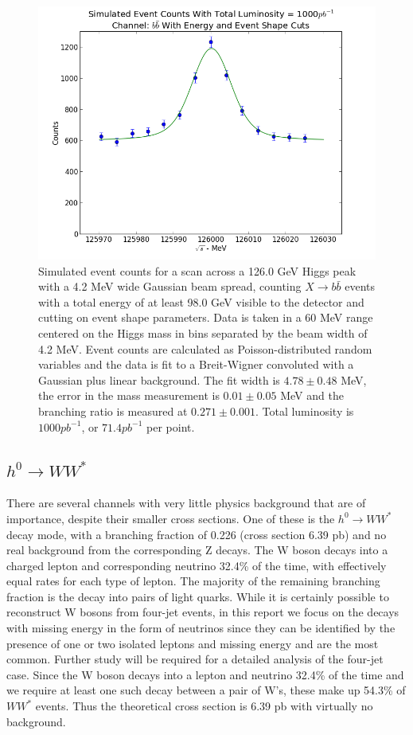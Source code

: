 \documentclass[a4paper]{article}
\begin{document}
\begin{figure}
	\includegraphics[width=\textwidth]{data-fit-bbbar-cut}
	\caption{Simulated event counts for a scan across a 126.0 GeV Higgs peak with a 4.2 MeV wide Gaussian beam spread, counting $X\rightarrow b\bar{b}$ events with a total energy of at least 98.0 GeV visible to the detector and cutting on event shape parameters. Data is taken in a 60 MeV range centered on the Higgs mass in bins separated by the beam width of 4.2 MeV. Event counts are calculated as Poisson-distributed random variables and the data is fit to a Breit-Wigner convoluted with a Gaussian plus linear background. The fit width is $4.78\pm0.48$ MeV, the error in the mass measurement is $0.01\pm0.05$ MeV and the branching ratio is measured at $0.271\pm0.001$. Total luminosity is $1000pb^{-1}$, or $71.4pb^{-1}$ per point.}
\label{data-fit-bbbar-cut}
\end{figure}

\subsection{$h^0\rightarrow WW^*$}
There are several channels with very little physics background that are of importance, despite their smaller cross sections. One of these is the $h^0\rightarrow WW^*$ decay mode, with a branching fraction of 0.226 (cross section 6.39 pb) and no real background from the corresponding Z decays. The W boson decays into a charged lepton and corresponding neutrino 32.4\% of the time, with effectively equal rates for each type of lepton. The majority of the remaining branching fraction is the decay into pairs of light quarks. While it is certainly possible to reconstruct W bosons from four-jet events, in this report we focus on the decays with missing energy in the form of neutrinos since they can be identified by the presence of one or two isolated leptons and missing energy and are the most common. Further study will be required for a detailed analysis of the four-jet case. Since the W boson decays into a lepton and neutrino 32.4\% of the time and we require at least one such decay between a pair of W's, these make up 54.3\% of $WW^*$ events. Thus the theoretical cross section is 6.39 pb with virtually no background.
\end{document}
